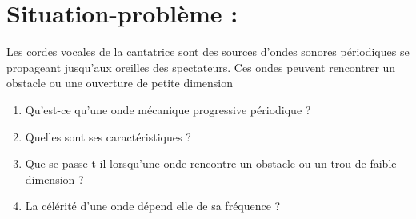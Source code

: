 \documentclass[12pt]{article}
\begin{document}
\section*{Situation-problème :}
Les cordes vocales de la cantatrice sont des sources d’ondes sonores périodiques se
propageant jusqu’aux oreilles des spectateurs. Ces ondes peuvent rencontrer un obstacle ou
une ouverture de petite dimension

\begin{enumerate}
\item  Qu’est-ce qu’une onde mécanique progressive périodique ?
\item Quelles sont ses caractéristiques ?
\item Que se passe-t-il lorsqu’une onde rencontre un obstacle ou un trou de faible dimension ?
\item La célérité d’une onde dépend elle de sa fréquence ?
\end{enumerate}
\end{document}
